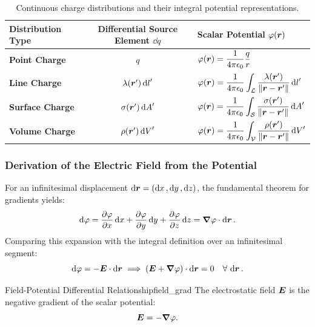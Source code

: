 \begin{table}[htbp]
\centering
\renewcommand{\arraystretch}{1.3}
\begin{tabular}{|l|c|l|}
    \hline
    \textbf{Distribution Type} & \textbf{Differential Source Element} $\dd{q}$ & \textbf{Scalar Potential} $\varphi(\vb*{r})$ \\
    \hline
    \textbf{Point Charge} & $q$ & $\varphi(\vb*{r}) = \dfrac{1}{4\pi\epsilon_0}\dfrac{q}{r}$ \\
    \textbf{Line Charge} & $\lambda(\vb*{r}') \dd{l}'$ & $\varphi(\vb*{r}) = \dfrac{1}{4\pi\epsilon_0} \displaystyle\int_{\mathcal{L}} \dfrac{\lambda(\vb*{r}')}{\norm{\vb*{r}-\vb*{r}'}} \dd{l}'$ \\
    \textbf{Surface Charge} & $\sigma(\vb*{r}') \dd{A}'$ & $\varphi(\vb*{r}) = \dfrac{1}{4\pi\epsilon_0} \displaystyle\int_{\mathcal{S}} \dfrac{\sigma(\vb*{r}')}{\norm{\vb*{r}-\vb*{r}'}} \dd{A}'$ \\
    \textbf{Volume Charge} & $\rho(\vb*{r}') \dd{V}'$ & $\varphi(\vb*{r}) = \dfrac{1}{4\pi\epsilon_0} \displaystyle\int_{\mathcal{V}} \dfrac{\rho(\vb*{r}')}{\norm{\vb*{r}-\vb*{r}'}} \dd{V}'$ \\
    \hline
\end{tabular}
\caption{Continuous charge distributions and their integral potential representations.}
\end{table}

\subsubsection{Derivation of the Electric Field from the Potential}

For an infinitesimal displacement $\dd{\vb*{r}} = (\dd{x}, \dd{y}, \dd{z})$, the fundamental theorem for gradients yields:
\begin{equation}
    \dd{\varphi} = \pdv{\varphi}{x}\dd{x} + \pdv{\varphi}{y}\dd{y} + \pdv{\varphi}{z}\dd{z} = \grad{\varphi} \cdot \dd{\vb*{r}}.
\end{equation}
Comparing this expansion with the integral definition over an infinitesimal segment:
\begin{equation}
    \dd{\varphi} = -\vb*{E} \cdot \dd{\vb*{r}} \implies (\vb*{E} + \grad{\varphi}) \cdot \dd{\vb*{r}} = 0 \quad \forall\, \dd{\vb*{r}}.
\end{equation}

\begin{proposition}{Field-Potential Differential Relationship}{field_grad}
The electrostatic field $\vb*{E}$ is the negative gradient of the scalar potential:
\begin{equation}
    \vb*{E} = -\grad{\varphi}.
\end{equation}
\end{proposition}

